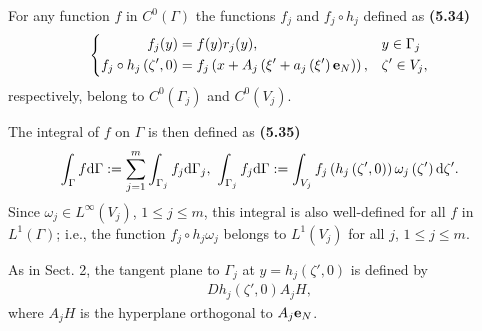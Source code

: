 \documentclass{book}
\numberwithin{equation}{section}
\begin{document}
\begin{enumerate}
\begin{enumerate}
        For any function $f$ in $C^0(\Gamma)$ the functions $f_j$ and $f_j\circ h_j$ defined as \textbf{(5.34)}
        \begin{equation*}
            \left\{\begin{split}
                f_j(y) &= f(y)r_j(y), &&y\in\Gamma_j\\
                f_j\circ h_j\left(\zeta',0\right) &= f_j\left(x + A_j\left(\xi' + a_j\left(\xi'\right){\bf e}_N\right)\right), &&\zeta'\in V_j,
            \end{split}\right.
        \end{equation*}
        respectively, belong to $C^0(\Gamma_j)$ and $C^0(V_j)$.
        
        The integral of $f$ on $\Gamma$ is then defined as \textbf{(5.35)}
        \begin{align*}
            \int_\Gamma f{\rm d}\Gamma := \sum_{j=1}^m \int_{\Gamma_j} f_j{\rm d}\Gamma_j,\ \int_{\Gamma_j} f_j{\rm d}\Gamma := \int_{V_j} f_j\left(h_j\left(\zeta',0\right)\right)\omega_j\left(\zeta'\right){\rm d}\zeta'.
        \end{align*}
        Since $\omega_j\in L^\infty(V_j)$, $1\le j\le m$, this integral is also well-defined for all $f$ in $L^1(\Gamma)$; i.e., the function $f_j\circ h_j\omega_j$ belongs to $L^1(V_j)$ for all $j$, $1\le j\le m$.
        
        As in Sect. 2, the tangent plane to $\Gamma_j$ at $y = h_j\left(\zeta',0\right)$ is defined by
        \begin{align*}
            Dh_j\left(\zeta',0\right)A_jH,
        \end{align*}
        where $A_jH$ is the hyperplane orthogonal to $A_j{\bf e}_N$.
        

\end{enumerate}
\end{enumerate}
\end{document}
